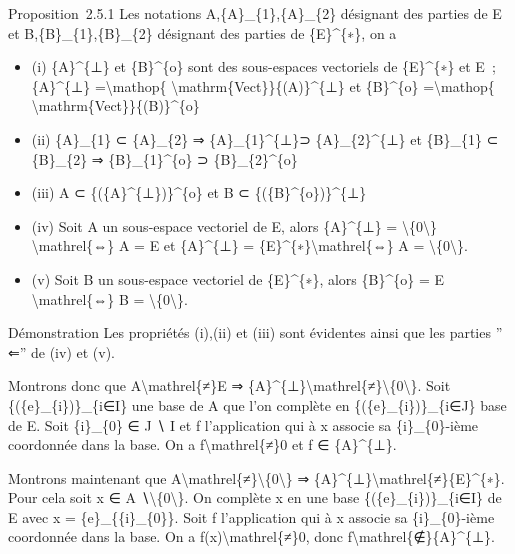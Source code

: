 \documentclass[]{article}
\begin{document}
Proposition~2.5.1 Les notations A,\{A\}\_\{1\},\{A\}\_\{2\} désignant
des parties de E et B,\{B\}\_\{1\},\{B\}\_\{2\} désignant des parties de
\{E\}\^{}\{∗\}, on a

\begin{itemize}
\itemsep1pt\parskip0pt
\item
  (i) \{A\}\^{}\{⊥\} et \{B\}\^{}\{o\} sont des sous-espaces vectoriels
  de \{E\}\^{}\{∗\} et E~; \{A\}\^{}\{⊥\} =\textbackslash{}mathop\{
  \textbackslash{}mathrm\{Vect\}\}\{(A)\}\^{}\{⊥\} et \{B\}\^{}\{o\}
  =\textbackslash{}mathop\{
  \textbackslash{}mathrm\{Vect\}\}\{(B)\}\^{}\{o\}
\item
  (ii) \{A\}\_\{1\} ⊂ \{A\}\_\{2\} ⇒ \{A\}\_\{1\}\^{}\{⊥\}⊃
  \{A\}\_\{2\}\^{}\{⊥\} et \{B\}\_\{1\} ⊂ \{B\}\_\{2\} ⇒
  \{B\}\_\{1\}\^{}\{o\} ⊃ \{B\}\_\{2\}\^{}\{o\}
\item
  (iii) A ⊂ \{(\{A\}\^{}\{⊥\})\}\^{}\{o\} et B ⊂
  \{(\{B\}\^{}\{o\})\}\^{}\{⊥\}
\item
  (iv) Soit A un sous-espace vectoriel de E, alors \{A\}\^{}\{⊥\} =
  \textbackslash{}\{0\textbackslash{}\} \textbackslash{}mathrel\{⇔\} A =
  E et \{A\}\^{}\{⊥\} = \{E\}\^{}\{∗\}\textbackslash{}mathrel\{⇔\} A =
  \textbackslash{}\{0\textbackslash{}\}.
\item
  (v) Soit B un sous-espace vectoriel de \{E\}\^{}\{∗\}, alors
  \{B\}\^{}\{o\} = E \textbackslash{}mathrel\{⇔\} B =
  \textbackslash{}\{0\textbackslash{}\}.
\end{itemize}

Démonstration Les propriétés (i),(ii) et (iii) sont évidentes ainsi que
les parties '' ⇐'' de (iv) et (v).

Montrons donc que A\textbackslash{}mathrel\{≠\}E ⇒
\{A\}\^{}\{⊥\}\textbackslash{}mathrel\{≠\}\textbackslash{}\{0\textbackslash{}\}.
Soit \{(\{e\}\_\{i\})\}\_\{i∈I\} une base de A que l'on complète en
\{(\{e\}\_\{i\})\}\_\{i∈J\} base de E. Soit \{i\}\_\{0\} ∈ J ∖ I et f
l'application qui à x associe sa \{i\}\_\{0\}-ième coordonnée dans la
base. On a f\textbackslash{}mathrel\{≠\}0 et f ∈ \{A\}\^{}\{⊥\}.

Montrons maintenant que
A\textbackslash{}mathrel\{≠\}\textbackslash{}\{0\textbackslash{}\} ⇒
\{A\}\^{}\{⊥\}\textbackslash{}mathrel\{≠\}\{E\}\^{}\{∗\}. Pour cela soit
x ∈ A ∖\textbackslash{}\{0\textbackslash{}\}. On complète x en une base
\{(\{e\}\_\{i\})\}\_\{i∈I\} de E avec x = \{e\}\_\{\{i\}\_\{0\}\}. Soit
f l'application qui à x associe sa \{i\}\_\{0\}-ième coordonnée dans la
base. On a f(x)\textbackslash{}mathrel\{≠\}0, donc
f\textbackslash{}mathrel\{∉\}\{A\}\^{}\{⊥\}.
\end{document}
